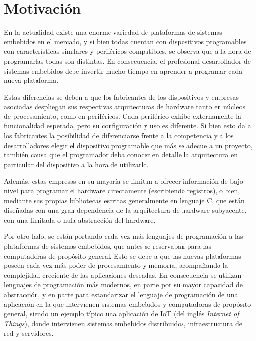 \section{Motivación}
\label{sec:motivacion}

En la actualidad existe una enorme variedad de plataformas de sistemas embebidos en el mercado, y si bien todas cuentan con dispositivos programables con características similares y periféricos compatibles, se observa que a la hora de programarlas todas son distintas. En consecuencia, el profesional desarrollador de sistemas embebidos debe invertir mucho tiempo en aprender a programar cada nueva plataforma.

Estas diferencias se deben a que los fabricantes de los dispositivos y empresas asociadas despliegan sus respectivas arquitecturas de hardware tanto en núcleos de procesamiento, como en periféricos. Cada periférico exhibe externamente la funcionalidad esperada, pero su configuración y uso es diferente. Si bien esto da a los fabricantes la posibilidad de diferenciarse frente a la competencia y a los desarrolladores elegir el dispositivo programable que más se adecue a un proyecto, también causa que el programador deba conocer en detalle la arquitectura en particular del dispositivo a la hora de utilizarlo.

Además, estas empresas en su mayoría se limitan a ofrecer información de bajo nivel para programar el hardware directamente (escribiendo registros), o bien, mediante sus propias bibliotecas escritas generalmente en lenguaje C, que están diseñadas con una gran dependencia de la arquitectura de hardware subyacente, con una limitada o nula abstracción del hardware.

Por otro lado, se están portando cada vez más lenguajes de programación a las plataformas de sistemas embebidos, que antes se reservaban para las computadoras de propósito general. Esto se debe a que las nuevas plataformas poseen cada vez más poder de procesamiento y memoria, acompañando la complejidad creciente de las aplicaciones deseadas. En consecuencia se utilizan lenguajes de programación más modernos, en parte por su mayor capacidad de abstracción, y en parte para estandarizar el lenguaje de programación de una aplicación en la que intervienen sistemas embebidos y computadoras de propósito general, siendo un ejemplo típico una aplicación de IoT (del inglés \emph{Internet of Things}), donde intervienen sistemas embebidos distribuidos, infraestructura de red y servidores.


